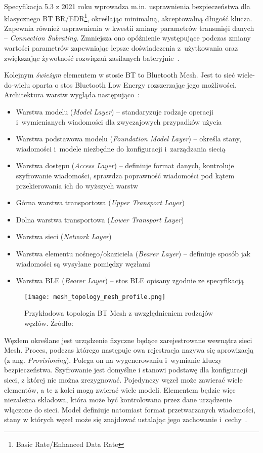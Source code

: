 Specyfikacja 5.3 z 2021 roku wprowadza m.in. usprawnienia bezpieczeństwa dla klasycznego BT BR/EDR\footnote{Basic Rate/Enhanced Data Rate}, określając
minimalną, akceptowalną długość klucza. Zapewnia również usprawnienia w kwestii zmiany parametrów transmisji
danych -- \textit{Connection Subrating}. Zmniejsza ono opóźnienie występujące podczas zmiany wartości parametrów
zapewniając lepsze doświadczenia z~użytkowania oraz zwiększając żywotność rozwiązań zasilanych 
bateryjnie~\cite{woolley_bluetooth_2021}.

Kolejnym \textit{świeżym} elementem w stosie BT to Bluetooth Mesh. Jest to sieć wiele-do-wielu oparta o stos Bluetooth Low Energy
rozszerzając jego możliwości. Architektura warstw wygląda następująco~\cite{mesh_working_group_mesh_2019}:
\begin{itemize}
\item Warstwa modelu (\textit{Model Layer}) -- standaryzuje rodzaje operacji i~wymienianych wiadomości dla zwyczajowych przypadków użycia
\item Warstwa podstawowa modelu (\textit{Foundation Model Layer}) -- określa stany, wiadomości i~modele niezbędne do konfiguracji i~zarządzania siecią
\item Warstwa dostępu (\textit{Access Layer}) -- definiuje format danych, kontroluje szyfrowanie wiadomości, sprawdza poprawność wiadomości
pod kątem przekierowania ich do wyższych warstw
\item Górna warstwa transportowa (\textit{Upper Transport Layer})
\item Dolna warstwa transportowa (\textit{Lower Transport Layer})
\item Warstwa sieci (\textit{Network Layer})
\item Warstwa elementu nośnego/okaziciela (\textit{Bearer Layer}) -- definiuje sposób jak wiadomości są wysyłane pomiędzy węzłami
\item Warstwa BLE (\textit{Bearer Layer}) -- stos BLE opisany zgodnie ze specyfikacją
\end{itemize}

\begin{figure}[!ht]
	\centering \texttt{[image: mesh\_topology\_mesh\_profile.png]}
	\caption{Przykładowa topologia BT Mesh z uwzględnieniem rodzajów węzłów. Źródło:~\cite{mesh_working_group_mesh_2019}}
	\label{rys:mesh_topology_mesh_profile}
\end{figure}


Węzłem określane jest urządzenie fizyczne będące zarejestrowane wewnątrz sieci Mesh. Proces, podczas którego 
następuje owa rejestracja nazywa się aprowizacją (z ang. \textit{Provisioning}). Polega on na wygenerowaniu
i~wymianie kluczy bezpieczeństwa. Szyfrowanie jest domyślne i stanowi podstawę dla konfiguracji sieci,
z której nie można zrezygnować. Pojedynczy węzeł może zawierać wiele elementów,
a te z kolei mogą zwierać wiele modeli. Elementem będzie więc niezależna składowa, która może być kontrolowana
przez dane urządzenie włączone do sieci. Model definiuje natomiast format przetwarzanych wiadomości, stany w których
węzeł może się znajdować ustalając jego zachowanie i~cechy~\cite{woolley_bluetooth_2020, st_an5292_2021}.

